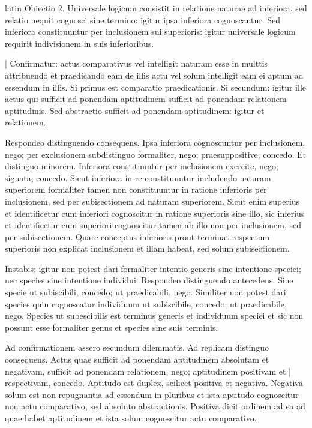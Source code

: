 \begin{otherlanguage*}{latin}
\pstart
Obiectio 2. Universale logicum consistit in relatione naturae ad inferiora, sed relatio nequit cognosci sine termino:
igitur ipsa inferiora cognoscantur. Sed inferiora constituuntur per inclusionem sui superioris:
igitur universale logicum requirit indivisionem in suis inferioribus. 
\pend

\pstart
\textnormal{|} Confirmatur:
actus comparativus vel intelligit naturam esse in multtis attribuendo et praedicando eam de illis actu vel solum intelligit eam ei aptum ad essendum in illis. Si primus est comparatio praedicationis. Si secundum:
igitur ille actus qui sufficit ad ponendam aptitudinem sufficit ad ponendam relationem aptitudinis. Sed abstractio sufficit ad ponendam aptitudinem:
igitur et relationem. 
\pend

\pstart
Respondeo distinguendo consequens. Ipsa inferiora cognoscuntur per inclusionem, nego; per exclusionem subdistinguo formaliter, nego; praesuppositive, concedo. Et distinguo minorem. Inferiora constituuntur per inclusionem exercite, nego; signata, concedo. Sicut inferiora in re constituuntur includendo naturam superiorem formaliter tamen non constituuntur in ratione inferioris per inclusionem, sed per subisectionem ad naturam superiorem. Sicut enim superius et identificetur cum inferiori cognoscitur in ratione superioris sine illo, sic inferius et identificetur cum superiori cognoscitur tamen ab illo non per inclusionem, sed per subisectionem. Quare conceptus inferioris prout terminat respectum superioris non explicat inclusionem et illam habeat, sed solum subisectionem. 
\pend

\pstart
Instabis:
igitur non potest dari formaliter intentio generis sine intentione speciei; nec species sine intentione individui. Respondeo distinguendo antecedens. Sine specie ut subiscibili, concedo; ut praedicabili, nego. Similiter non potest dari species quin cognoscatur individuum ut subiscibile, concedo; ut praedicabile, nego. Species ut subescibilis est terminus generis et individuum speciei et sic non possunt esse formaliter genus et species sine suis terminis. 
\pend

\pstart
Ad confirmationem assero secundum dilemmatis. Ad replicam distinguo consequens. Actus quae sufficit ad ponendam aptitudinem absolutam et negativam, sufficit ad ponendam relationem, nego; aptitudinem positivam et \textnormal{|} respectivam, concedo. Aptitudo est duplex, scilicet positiva et negativa. Negativa solum est non repugnantia ad essendum in pluribus et ista aptitudo cognoscitur non actu comparativo, sed absoluto abstractionis. Positiva dicit ordinem ad ea ad quae habet aptitudinem et ista solum cognoscitur actu comparativo. 
\pend


\end{otherlanguage*}

